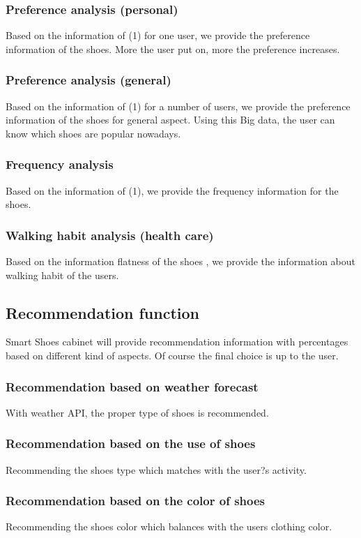 \documentclass[conference]{IEEEtran}
\begin{document}
\subsubsection{Preference analysis (personal)}
Based on the information of (1) for one user, we provide the preference information of the shoes. More the user put on, more the preference increases.
\subsubsection{Preference analysis (general)}
Based on the information of (1) for a number of users, we provide the preference information of the shoes for general aspect. Using this Big data, the user can know which shoes are popular nowadays.
\subsubsection{Frequency analysis}
Based on the information of (1), we provide the frequency information for the shoes.\subsubsection{Walking habit analysis (health care)}
Based on the information flatness of the shoes , we provide the information about walking habit of the users.\\


\subsection{Recommendation function}
Smart Shoes cabinet will provide recommendation information with percentages based on different kind of aspects. Of course the final choice is up to the user.
\subsubsection{Recommendation based on weather forecast }
With weather API, the proper type of shoes is recommended.
\subsubsection{ Recommendation based on the use of shoes}
Recommending the shoes type which matches with the user?s activity.
\subsubsection{Recommendation based on the color of shoes}
Recommending the shoes color which balances with the users clothing color.
\end{document}
